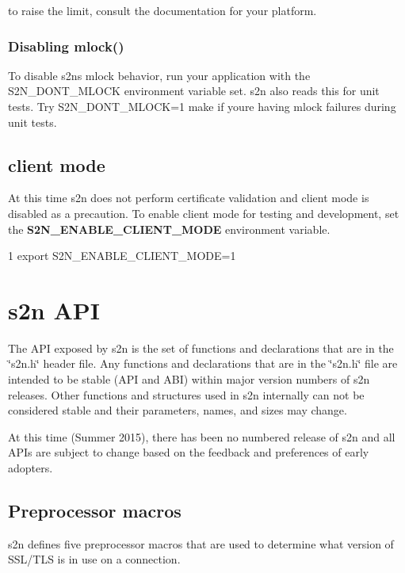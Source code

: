 to raise the limit, consult the documentation for your platform.

\subsubsection*{Disabling mlock()}

To disable s2n\textquotesingle{}s mlock behavior, run your application with the {\ttfamily S2\+N\+\_\+\+D\+O\+N\+T\+\_\+\+M\+L\+O\+CK} environment variable set. s2n also reads this for unit tests. Try {\ttfamily S2\+N\+\_\+\+D\+O\+N\+T\+\_\+\+M\+L\+O\+CK=1 make} if you\textquotesingle{}re having mlock failures during unit tests.

\subsection*{client mode}

At this time s2n does not perform certificate validation and client mode is disabled as a precaution. To enable client mode for testing and development, set the {\bfseries S2\+N\+\_\+\+E\+N\+A\+B\+L\+E\+\_\+\+C\+L\+I\+E\+N\+T\+\_\+\+M\+O\+DE} environment variable.


\begin{DoxyCode}
1 export S2N\_ENABLE\_CLIENT\_MODE=1
\end{DoxyCode}


\section*{s2n A\+PI}

The A\+PI exposed by s2n is the set of functions and declarations that are in the \char`\"{}s2n.\+h\char`\"{} header file. Any functions and declarations that are in the \char`\"{}s2n.\+h\char`\"{} file are intended to be stable (A\+PI and A\+BI) within major version numbers of s2n releases. Other functions and structures used in s2n internally can not be considered stable and their parameters, names, and sizes may change.

At this time (Summer 2015), there has been no numbered release of s2n and all A\+P\+Is are subject to change based on the feedback and preferences of early adopters.

\subsection*{Preprocessor macros}

s2n defines five preprocessor macros that are used to determine what version of S\+S\+L/\+T\+LS is in use on a connection.



